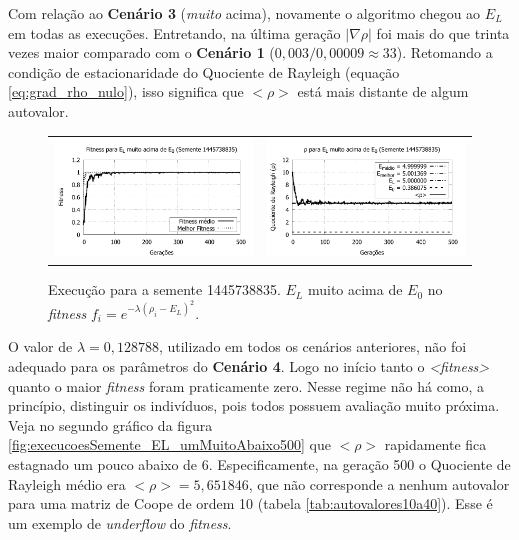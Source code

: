 	Com relação ao \textbf{Cenário 3} (\emph{muito} acima), novamente o algoritmo chegou ao $E_L$ em todas as execuções. Entretando, na última geração $|\nabla\rho|$ foi mais do que trinta vezes maior comparado com o \textbf{Cenário 1} ($0,003 / 0,00009 \approx 33$). Retomando a condição de estacionaridade do Quociente de Rayleigh (equação \ref{eq:grad_rho_nulo}), isso significa que $<\rho>$ está mais distante de algum autovalor.

	\begin{figure}[htbp]
	\centering
  \begin{tabular}{@{}cc@{}}	
		\includegraphics[width=.45\textwidth]{figs/resultados/variandoELSemente/T3_S-1445738835_fitness.pdf} &
    \includegraphics[width=.45\textwidth]{figs/resultados/variandoELSemente/T3_S-1445738835_rho.pdf}
  \end{tabular}
  \caption{Execução para a semente 1445738835. $E_L$ muito acima de $E_0$ no \textit{fitness} $f_i = e^{-\lambda(\rho_i - E_L)^2}$.}
	\label{fig:execucoesSemente_EL_umMuitoAcima}
	\end{figure}
		
	O valor de $\lambda = 0,128788$, utilizado em todos os cenários anteriores, não foi adequado para os parâmetros do \textbf{Cenário 4}. Logo no início tanto o \emph{<fitness>} quanto o maior \emph{fitness} foram praticamente zero.  Nesse regime não há como, a princípio, distinguir os indivíduos, pois todos possuem avaliação muito próxima. Veja no segundo gráfico da figura \ref{fig:execucoesSemente_EL_umMuitoAbaixo500} que $<\rho>$ rapidamente fica estagnado um pouco abaixo de 6. Especificamente, na geração 500 o Quociente de Rayleigh médio era $<\rho> = 5,651846$, que não corresponde a nenhum autovalor para uma matriz de Coope de ordem 10 (tabela \ref{tab:autovalores10a40}). Esse é um exemplo de \emph{underflow} do \emph{fitness}.
	
